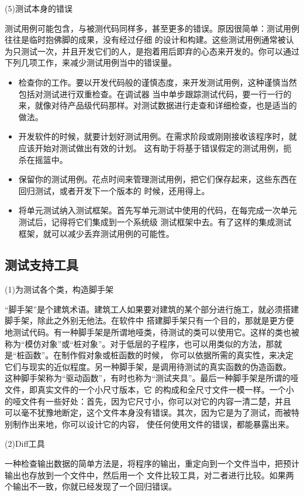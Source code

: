 \documentclass{article}
\begin{document}
\par
(5)测试本身的错误
\par
测试用例可能包含，与被测代码同样多，甚至更多的错误。原因很简单：测试用例往往是临时抱佛脚的成果，没有经过仔细
的设计和构建。这些测试用例通常被认为只测试一次，并且开发它们的人，是抱着用后即弃的心态来开发的。你可以通过
下列几项工作，来减少测试用例当中的错误量。
\begin{itemize}
    \item 检查你的工作。要以开发代码般的谨慎态度，来开发测试用例，这种谨慎当然包括对测试进行双重检查。在调试器
    当中单步跟踪测试代码，要一行一行的来，就像对待产品级代码那样。对测试数据进行走查和详细检查，也是适当的做法。
    \item 开发软件的时候，就要计划好测试用例。在需求阶段或刚刚接收该程序时，就应该开始对测试做出有效的计划。
    这有助于将基于错误假定的测试用例，扼杀在摇篮中。
    \item 保留你的测试用例。花点时间来管理测试用例，把它们保存起来，这些东西在回归测试，或者开发下一个版本的
    时候，还用得上。
    \item 将单元测试纳入测试框架。首先写单元测试中使用的代码，在每完成一次单元测试后，记得将它们集成到一个系统级
    测试框架中去。有了这样的集成测试框架，就可以减少丢弃测试用例的可能性。
\end{itemize}

\subsection{测试支持工具}
\par
(1)为测试各个类，构造脚手架
\par
“脚手架”是个建筑术语。建筑工人如果要对建筑的某个部分进行施工，就必须搭建脚手架，除此之外别无他法。在软件中
搭建脚手架只有一个目的，那就是更方便地测试代码。有一种脚手架是所谓地哑类，待测试的类可以使用它。这样的类也被
称为“模仿对象”或“桩对象”。对于低层的子程序，也可以用类似的方法，那就是“桩函数”。在制作假对象或桩函数的时候，
你可以依据所需的真实性，来决定它们与现实的近似程度。另一种脚手架，是调用待测试的真实函数的伪造函数。
这种脚手架称为“驱动函数”，有时也称为“测试夹具”。最后一种脚手架是所谓的哑文件，即真实文件的一个小尺寸版本，它
的构成和全尺寸文件一模一样。一个小的哑文件有一些好处：首先，因为它尺寸小，你可以对它的内容一清二楚，并且
可以毫不犹豫地断定，这个文件本身没有错误。其次，因为它是为了测试，而被特别制作出来地，你可以设计它的内容，
使任何使用文件的错误，都能暴露出来。

\par
(2)Diff工具
\par
一种检查输出数据的简单方法是，将程序的输出，重定向到一个文件当中，把预计输出也存放到一个文件中，然后用一个
文件比较工具，对二者进行比较。如果两个输出不一致，你就已经发现了一个回归错误。
\end{document}
